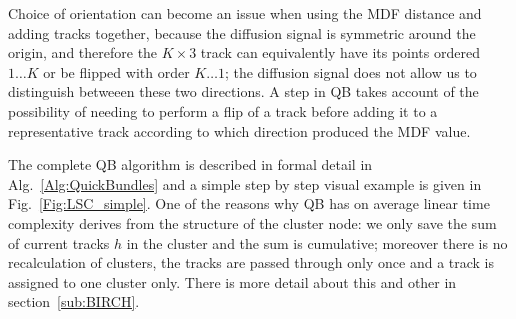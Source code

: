 \documentclass[preprint,authoryear,a4paper,10pt,onecolumn]{elsarticle}
\begin{document}
Choice of orientation can become an issue when using the MDF distance
and adding tracks together, because the diffusion signal is symmetric
around the origin, and therefore the $K \times 3$ track can equivalently
have its points ordered $1 \dots K$ or be flipped with order $K \dots
1$; the diffusion signal does not allow us to distinguish betweeen these
two directions. A step in QB takes account of the possibility of needing
to perform a flip of a track before adding it to a representative track
according to which direction produced the MDF value.


The complete QB algorithm is described in formal detail in
Alg.~\ref{Alg:QuickBundles} and a simple step by step visual example is given in
Fig.~\ref{Fig:LSC_simple}.  One of the reasons why QB has on average linear time
complexity derives from the structure of the cluster node: we only save the sum
of current tracks $h$ in the cluster and the sum is cumulative; moreover there
is no recalculation of clusters, the tracks are passed through only once and a
track is assigned to one cluster only.  There is more detail about this and other in
section~\ref{sub:BIRCH}.
\end{document}
